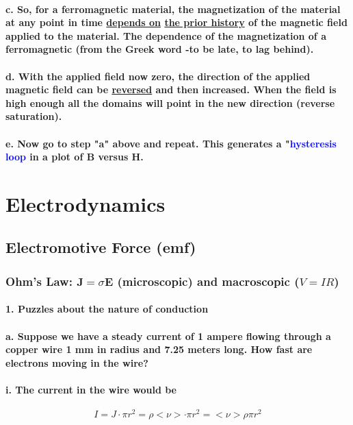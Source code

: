 \documentclass{article}
\begin{document}
\paragraph{\indent c. So, for a ferromagnetic material, the magnetization of the material at any point in time \underline{depends on} \underline{ the prior history} of the magnetic field applied to the material. The dependence of the magnetization of a ferromagnetic (from the Greek word -to be late, to lag behind).}
\paragraph{\indent d. With the applied field now zero, the direction of the applied magnetic field can be \underline{reversed} and then increased. When the field is high enough all the domains will point in the new direction (reverse saturation).}
\paragraph{\indent e. Now go to step "a" above and repeat. This generates a "\textcolor{blue}{hysteresis loop} in a plot of $\boldsymbol{B}$ versus $\boldsymbol{H}$.}
\section{Electrodynamics}
\subsection{Electromotive Force (emf)}
\subsubsection{Ohm's Law: $\boldsymbol{J}=\sigma\boldsymbol{E}$ (microscopic) and macroscopic ($V=IR$)}
\paragraph{1. Puzzles about the nature of conduction}
\paragraph{\indent a. Suppose we have a steady current of 1 ampere flowing through a copper wire 1 mm in radius and 7.25 meters long. How fast are electrons moving in the wire?}
\paragraph{\indent\indent i. The current in the wire would be}
\begin{equation*}
    I=J\cdot \pi r^2=\rho<\nu>\cdot \pi r^2=<\nu>\rho\pi r^2
\end{equation*}
\end{document}
